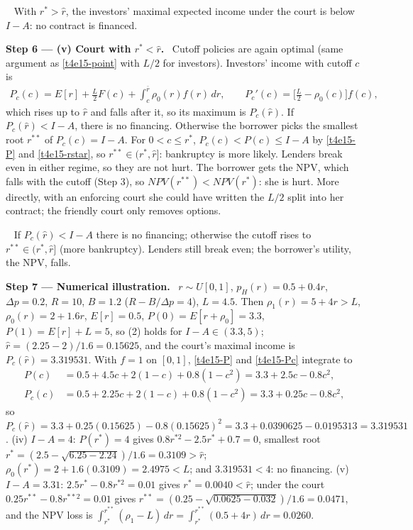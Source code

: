 \documentclass[11pt,a4paper]{article}
\newcommand{\step}[2]{\par\medskip\noindent\textbf{Step #1 --- #2.}~}
\newcommand{\answer}[1]{\par\smallskip\noindent\fbox{\textbf{Answer #1.}}~}
\begin{document}
\answer{(iv)} With $r^*>\hat r$, the investors' maximal expected income under the court is below
$I-A$: no contract is financed.

\step{6}{(v) Court with $r^*<\hat r$} Cutoff policies are again optimal (same argument as
\eqref{t4e15-point} with $L/2$ for investors). Investors' income with cutoff $c$ is
\begin{align}
  P_c(c)=E[r]+\frac L2F(c)+\int_c^{\bar r}\rho_0(r)f(r)\,dr, \qquad P_c'(c)=\Big[\frac L2-\rho_0(c)\Big]f(c), \label{t4e15-Pc}
\end{align}
which rises up to $\hat r$ and falls after it, so its maximum is $P_c(\hat r)$. If $P_c(\hat r)<I-A$, there
is no financing. Otherwise the borrower picks the smallest root $r^{**}$ of $P_c(c)=I-A$. For
$0<c\le r^*$, $P_c(c)<P(c)\le I-A$ by \eqref{t4e15-P} and \eqref{t4e15-rstar}, so $r^{**}\in(r^*,\hat r]$:
bankruptcy is more likely. Lenders break even in either regime, so they are not hurt. The borrower gets
the NPV, which falls with the cutoff (Step 3), so $\mathit{NPV}(r^{**})<\mathit{NPV}(r^*)$: she is hurt.
More directly, with an enforcing court she could have written the $L/2$ split into her contract; the
friendly court only removes options.

\answer{(v)} If $P_c(\hat r)<I-A$ there is no financing; otherwise the cutoff rises to
$r^{**}\in(r^*,\hat r]$ (more bankruptcy). Lenders still break even; the borrower's utility, the NPV,
falls.

\step{7}{Numerical illustration} $r\sim U[0,1]$, $p_H(r)=0.5+0.4r$, $\Delta p=0.2$, $R=10$, $B=1.2$
($R-B/\Delta p=4$), $L=4.5$. Then $\rho_1(r)=5+4r>L$, $\rho_0(r)=2+1.6r$, $E[r]=0.5$,
$P(0)=E[r+\rho_0]=3.3$, $P(1)=E[r]+L=5$, so (2) holds for $I-A\in(3.3,5)$; $\hat r=(2.25-2)/1.6=0.15625$,
and the court's maximal income is $P_c(\hat r)=3.319531$. With $f=1$ on $[0,1]$, \eqref{t4e15-P} and
\eqref{t4e15-Pc} integrate to
\begin{align}
  P(c) &= 0.5+4.5c+2(1-c)+0.8(1-c^2)=3.3+2.5c-0.8c^2, \nonumber\\
  P_c(c) &= 0.5+2.25c+2(1-c)+0.8(1-c^2)=3.3+0.25c-0.8c^2, \nonumber
\end{align}
so $P_c(\hat r)=3.3+0.25(0.15625)-0.8(0.15625)^2=3.3+0.0390625-0.0195313=3.319531$.
(iv) $I-A=4$: $P(r^*)=4$ gives $0.8r^{*2}-2.5r^*+0.7=0$, smallest root
$r^*=(2.5-\sqrt{6.25-2.24})/1.6=0.3109>\hat r$; $\rho_0(r^*)=2+1.6(0.3109)=2.4975<L$; and $3.319531<4$:
no financing. (v) $I-A=3.31$: $2.5r^*-0.8r^{*2}=0.01$ gives $r^*=0.0040<\hat r$; under the court
$0.25r^{**}-0.8r^{**2}=0.01$ gives $r^{**}=(0.25-\sqrt{0.0625-0.032})/1.6=0.0471$, and the NPV loss is
$\int_{r^*}^{r^{**}}(\rho_1-L)\,dr=\int_{r^*}^{r^{**}}(0.5+4r)\,dr=0.0260$.
\end{document}
